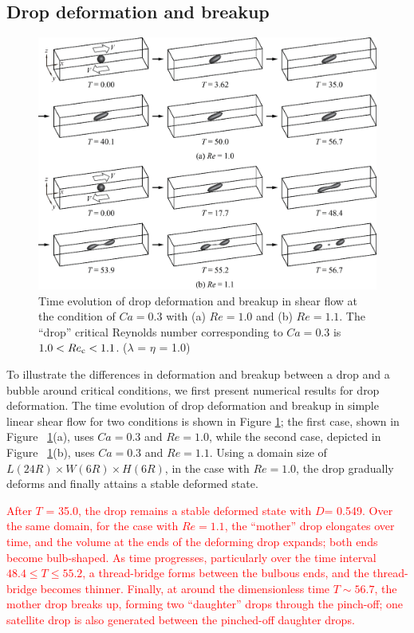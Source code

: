 \documentclass{elsarticle}
\newcommand{\lwh}[3]{L(#1R)\times W(#2R) \times H(#3R)}
\begin{document}
\subsection{Drop deformation and breakup}\label{sec:DropBreak}
% 
\begin{figure}%
  \centering
  \textcolor{red}
{
  \includegraphics[width=\textwidth]{Figure/4-DropBreakEvol}
  \caption{Time evolution of drop deformation and breakup in shear flow at the
           condition of $Ca=0.3$ with (a) $Re=1.0$ and (b) $Re=1.1$.  The
	   ``drop'' critical Reynolds number corresponding to $Ca=0.3$ is
	   $1.0<Re_{\rm c}<1.1$.
	   ($\lambda$ = $\eta$ = 1.0)}
 }
  \label{fig:DropBreak}
\end{figure}
%
To illustrate the differences in deformation and breakup between a drop and a bubble around critical conditions, we first present numerical results for drop deformation.  The time evolution of drop deformation and breakup in simple linear shear flow for two conditions is shown in Figure \ref{fig:DropBreak}; the first case, shown in Figure ~\ref{fig:DropBreak}(a), uses $Ca=0.3$ and $Re=1.0$, while the second case, depicted in Figure ~\ref{fig:DropBreak}(b), uses $Ca=0.3$ and $Re=1.1$.  Using a domain size of $\lwh{24}{6}{6}$, in the case with $Re=1.0$, the drop gradually deforms and finally attains a stable deformed state. 

\textcolor{red}
{
After $T$ = 35.0, the drop remains a stable deformed state with $D$= 0.549.  Over the same domain, for the case with $Re=1.1$, the ``mother'' drop elongates over time, and the volume at the ends of the deforming drop expands; both ends become bulb-shaped.  As time progresses, particularly over the time interval $48.4 \leq T \leq 55.2$, a thread-bridge forms between the bulbous ends, and the thread-bridge becomes thinner.  Finally, at around the dimensionless time $T\sim 56.7$, the mother drop breaks up, forming two ``daughter'' drops through the pinch-off; one satellite drop is also generated between the pinched-off daughter drops.  
}
\end{document}
